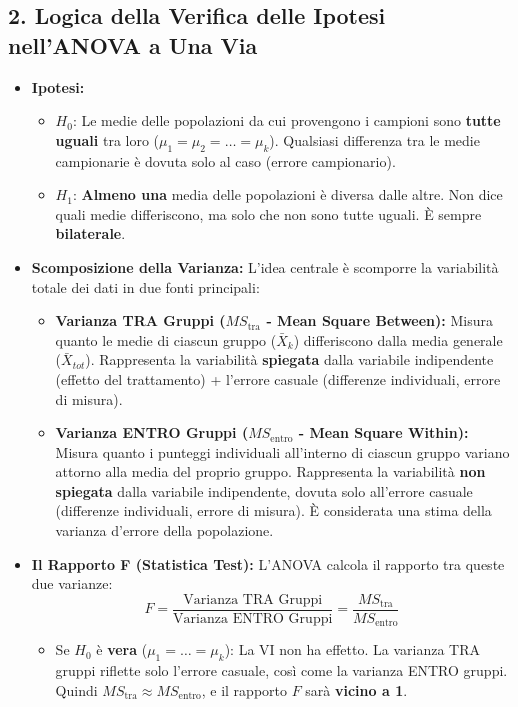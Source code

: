 \documentclass[12pt, a4paper]{article}
\newcommand{\popmean}{\mu}
\newcommand{\samplemean}{\bar{X}}
\newcommand{\Fscore}{F} %
\newcommand{\Hnull}{H_0} %
\newcommand{\Halt}{H_1} %
\newcommand{\MSb}{MS_{\text{tra}}} %
\newcommand{\MSw}{MS_{\text{entro}}} %
\begin{document}
\subsection*{2. Logica della Verifica delle Ipotesi nell'ANOVA a Una Via}
\begin{itemize}
    \item \textbf{Ipotesi:}
        \begin{itemize}
            \item $\Hnull$: Le medie delle popolazioni da cui provengono i campioni sono \textbf{tutte uguali} tra loro ($\popmean_1 = \popmean_2 = \dots = \popmean_k$). Qualsiasi differenza tra le medie campionarie è dovuta solo al caso (errore campionario).
            \item $\Halt$: \textbf{Almeno una} media delle popolazioni è diversa dalle altre. Non dice quali medie differiscono, ma solo che non sono tutte uguali. È sempre \textbf{bilaterale}.
        \end{itemize}
    \item \textbf{Scomposizione della Varianza:} L'idea centrale è scomporre la variabilità totale dei dati in due fonti principali:
        \begin{itemize}
            \item \textbf{Varianza TRA Gruppi ($\MSb$ - Mean Square Between):} Misura quanto le medie di ciascun gruppo ($\samplemean_k$) differiscono dalla media generale ($\bar{X}_{tot}$). Rappresenta la variabilità \textbf{spiegata} dalla variabile indipendente (effetto del trattamento) + l'errore casuale (differenze individuali, errore di misura).
            \item \textbf{Varianza ENTRO Gruppi ($\MSw$ - Mean Square Within):} Misura quanto i punteggi individuali all'interno di ciascun gruppo variano attorno alla media del proprio gruppo. Rappresenta la variabilità \textbf{non spiegata} dalla variabile indipendente, dovuta solo all'errore casuale (differenze individuali, errore di misura). È considerata una stima della varianza d'errore della popolazione.
        \end{itemize}
    \item \textbf{Il Rapporto F (Statistica Test):} L'ANOVA calcola il rapporto tra queste due varianze:
        $$ \Fscore = \frac{\text{Varianza TRA Gruppi}}{\text{Varianza ENTRO Gruppi}} = \frac{\MSb}{\MSw} $$
        \begin{itemize}
            \item Se $\Hnull$ è \textbf{vera} ($\popmean_1 = \dots = \popmean_k$): La VI non ha effetto. La varianza TRA gruppi riflette solo l'errore casuale, così come la varianza ENTRO gruppi. Quindi $\MSb \approx \MSw$, e il rapporto $\Fscore$ sarà \textbf{vicino a 1}.

\end{itemize}
\end{itemize}
\end{document}
